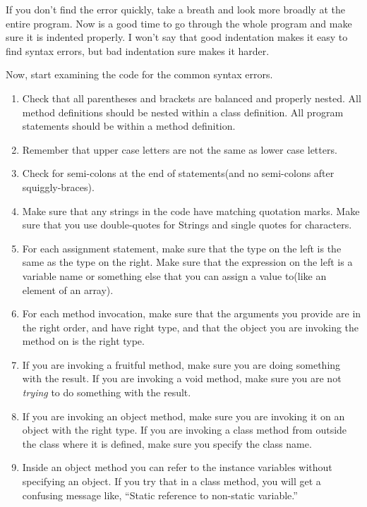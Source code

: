 \documentclass{book}
\begin{document}
If you don't find the error quickly, take a breath and look more
broadly at the entire program.  Now is a good time to go through the
whole program and make sure it is indented properly.  I won't say that
good indentation makes it easy to find syntax errors, but bad
indentation sure makes it harder.

Now, start examining the code for the common syntax errors.

\begin{enumerate}

\item Check that all parentheses and brackets are
balanced and properly nested.  All method definitions should be nested
within a class definition.  All program statements should be within a
method definition.

\item Remember that upper case letters are not the same as
lower case letters.

\item Check for semi-colons at the end of statements(and
no semi-colons after squiggly-braces).

\item Make sure that any strings in the code have matching
quotation marks.  Make sure that you use double-quotes for
Strings and single quotes for characters.

\item For each assignment statement, make sure that the type
on the left is the same as the type on the right.  Make sure
that the expression on the left is a variable name or something
else that you can assign a value to(like an element of an array).

\item For each method invocation, make sure that the arguments
you provide are in the right order, and have right type, and that the
object you are invoking the method on is the right type.

\item If you are invoking a fruitful method, make sure you
are doing something with the result.  If you are invoking a
void method, make sure you are not {\em trying} to do something
with the result.

\item If you are invoking an object method, make sure you are
invoking it on an object with the right type.  If you are invoking
a class method from outside the class where it is defined, make
sure you specify the class name.

\item Inside an object method you can refer to the instance
variables without specifying an object.  If you try that in
a class method, you will get a confusing message like, ``Static
reference to non-static variable.''

\end{enumerate}
\end{document}
